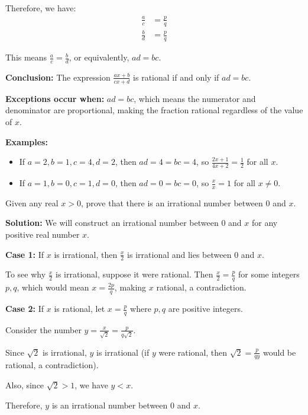 Therefore, we have:
\begin{align*}
\frac{a}{c} &= \frac{p}{q} \\
\frac{b}{d} &= \frac{p}{q}
\end{align*}

This means $\frac{a}{c} = \frac{b}{d}$, or equivalently, $ad = bc$.

\textbf{Conclusion:}
The expression $\frac{ax + b}{cx + d}$ is rational if and only if $ad = bc$.

\textbf{Exceptions occur when:}
$ad = bc$, which means the numerator and denominator are proportional, making the fraction rational regardless of the value of $x$.

\textbf{Examples:}
\begin{itemize}
\item If $a = 2, b = 1, c = 4, d = 2$, then $ad = 4 = bc = 4$, so $\frac{2x + 1}{4x + 2} = \frac{1}{2}$ for all $x$.
\item If $a = 1, b = 0, c = 1, d = 0$, then $ad = 0 = bc = 0$, so $\frac{x}{x} = 1$ for all $x \neq 0$.
\end{itemize}

\begin{problembox}
Given any real $x > 0$, prove that there is an irrational number between $0$ and $x$.
\end{problembox}

\textbf{Solution:}
We will construct an irrational number between $0$ and $x$ for any positive real number $x$.

\textbf{Case 1:} If $x$ is irrational, then $\frac{x}{2}$ is irrational and lies between $0$ and $x$.

To see why $\frac{x}{2}$ is irrational, suppose it were rational. Then $\frac{x}{2} = \frac{p}{q}$ for some integers $p, q$, which would mean $x = \frac{2p}{q}$, making $x$ rational, a contradiction.

\textbf{Case 2:} If $x$ is rational, let $x = \frac{p}{q}$ where $p, q$ are positive integers.

Consider the number $y = \frac{x}{\sqrt{2}} = \frac{p}{q\sqrt{2}}$.

Since $\sqrt{2}$ is irrational, $y$ is irrational (if $y$ were rational, then $\sqrt{2} = \frac{p}{qy}$ would be rational, a contradiction).

Also, since $\sqrt{2} > 1$, we have $y < x$.

Therefore, $y$ is an irrational number between $0$ and $x$.

